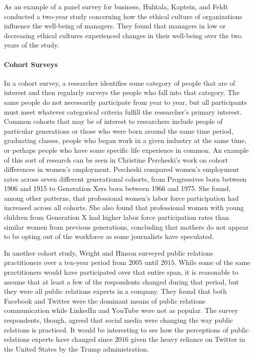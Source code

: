 As an example of a panel survey for business, Huhtala, Kaptein, and Feldt conducted a two-year study concerning how the ethical culture of organizations influence the well-being of managers\cite{huhtala2016perceived}. They found that managers in low or decreasing ethical cultures experienced changes in their well-being over the two years of the study.

\paragraph{Cohort Surveys}

In a cohort survey, a researcher identifies some category of people that are of interest and then regularly surveys the people who fall into that category. The same people do not necessarily participate from year to year, but all participants must meet whatever categorical criteria fulfill the researcher's primary interest. Common cohorts that may be of interest to researchers include people of particular generations or those who were born around the same time period, graduating classes, people who began work in a given industry at the same time, or perhaps people who have some specific life experience in common. An example of this sort of research can be seen in Christine Percheski’s work on cohort differences in women's employment\cite{percheski2008opting}. Percheski compared women's employment rates across seven different generational cohorts, from Progressives born between 1906 and 1915 to Generation Xers born between 1966 and 1975. She found, among other patterns, that professional women's labor force participation had increased across all cohorts. She also found that professional women with young children from Generation X had higher labor force participation rates than similar women from previous generations, concluding that mothers do not appear to be opting out of the workforce as some journalists have speculated.

In another cohort study, Wright and Hinson surveyed public relations practitioners over a ten-year period from $ 2005 $ until $ 2015 $\cite{wright2015examining}. While some of the same practitioners would have participated over that entire span, it is reasonable to assume that at least a few of the respondents changed during that period, but they were all public relations experts in a company. They found that both Facebook and Twitter were the dominant means of public relations communication while LinkedIn and YouTube were not as popular. The survey respondents, though, agreed that social media were changing the way public relations is practiced. It would be interesting to see how the perceptions of public relations experts have changed since $ 2016 $ given the heavy reliance on Twitter in the United States by the Trump administration.

